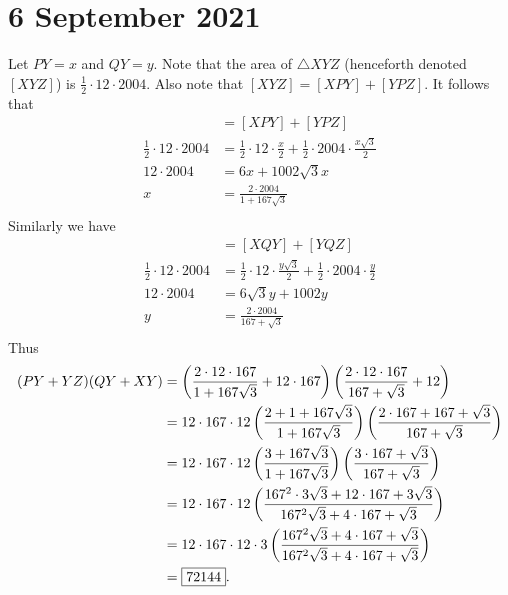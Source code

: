 \documentclass[letterpaper,oneside]{scrartcl}
\begin{document}
\section*{6 September 2021}
Let \(PY=x\)  and \(QY=y.\) 
Note that the area of \(\triangle XYZ\) (henceforth denoted \([XYZ]\)) is \(\frac{1}{2}\cdot12\cdot2004.\)
Also note that \([XYZ]=[XPY]+[YPZ].\) It follows that
\begin{align*}
    [XYZ]&=[XPY]+[YPZ]\\
    \frac12\cdot12\cdot2004 &= \frac12\cdot12\cdot\frac{x}{2}+\frac12\cdot2004\cdot\frac{x\sqrt3}{2}\\
    12\cdot2004&=6x+1002\sqrt3x\\
    x&= \frac{2\cdot2004}{1+167\sqrt3}\\
\end{align*}
Similarly we have
\begin{align*}
    [XYZ]&=[XQY]+[YQZ]\\
    \frac12\cdot12\cdot2004 &= \frac12\cdot12\cdot\frac{y\sqrt3}{2}+\frac12\cdot2004\cdot\frac{y}{2}\\
    12\cdot2004&=6\sqrt3y+1002y\\
    y&=\frac{2\cdot2004}{167+\sqrt3}\\
\end{align*}
Thus
\begin{align*}
    (PY+YZ)(QY+XY)&=\left(\frac{2\cdot12\cdot167}{1+167\sqrt3}+12\cdot167\right)\left(\frac{2\cdot12\cdot167}{167+\sqrt3}+12\right)\\
    &=12\cdot167\cdot12\left(\frac{2+1+167\sqrt3}{1+167\sqrt3}\right)\left(\frac{2\cdot167+167+\sqrt3}{167+\sqrt3}\right)\\
    &=12\cdot167\cdot12\left(\frac{3+167\sqrt3}{1+167\sqrt3}\right)\left(\frac{3\cdot167+\sqrt3}{167+\sqrt3}\right)\\
    &=12\cdot167\cdot12\left(\frac{167^2\cdot3\sqrt3+12\cdot167+3\sqrt3}{167^2\sqrt3+4\cdot167+\sqrt3}\right)\\
    &=12\cdot167\cdot12\cdot3\left(\frac{167^2\sqrt3+4\cdot167+\sqrt3}{167^2\sqrt3+4\cdot167+\sqrt3}\right)\\
    &=\fbox{72144}.
\end{align*}
\end{document}
